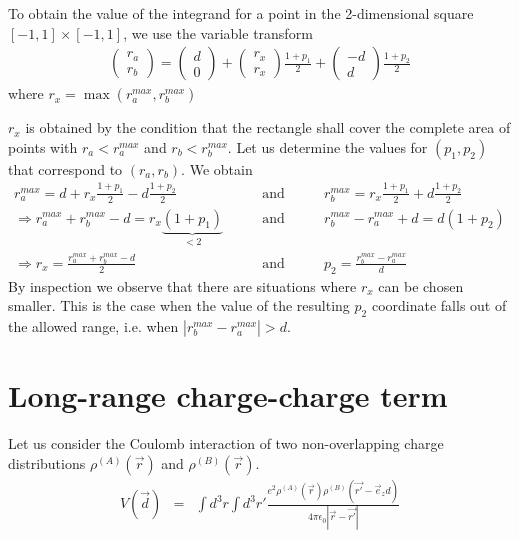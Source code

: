 \documentclass[11pt,a4paper]{report}
\begin{document}
To obtain the value of the integrand for a point in the 2-dimensional
square $[-1,1]\times[-1,1]$, we use the variable transform
\begin{eqnarray*}
\left(\begin{array}{c}r_a\\r_b\end{array}\right)
=\left(\begin{array}{c}d\\0\end{array}\right)
+\left(\begin{array}{c}r_x\\r_x\end{array}\right)\frac{1+p_1}{2}
+\left(\begin{array}{c}-d\\d\end{array}\right)\frac{1+p_2}{2}
\end{eqnarray*}
where $r_x=\max(r_a^{max},r_b^{max})$

$r_x$ is obtained by the condition that the rectangle shall cover the
complete area of points with $r_a<r_a^{max}$ and $r_b< r_b^{max}$.
Let us determine the values for $(p_1,p_2)$ that correspond to $(r_a,r_b)$.
We obtain
\begin{eqnarray*}
r^{max}_a=d+r_x\frac{1+p_1}{2}-d\frac{1+p_2}{2}
&\qquad\text{and}\qquad&
r^{max}_b=r_x\frac{1+p_1}{2}+d\frac{1+p_2}{2}
\\
\Rightarrow
r^{max}_a+r^{max}_b-d=r_x\underbrace{(1+p_1)}_{<2}
&\qquad\text{and}\qquad&
r^{max}_b-r^{max}_a+d=d(1+p_2)
\\
\Rightarrow
r_x=\frac{r^{max}_a+r^{max}_b-d}{2}
&\qquad\text{and}\qquad&
p_2=\frac{r^{max}_b-r^{max}_a}{d}
\end{eqnarray*}
By inspection we observe that there are situations where $r_x$ can be
chosen smaller. This is the case when the value of the resulting $p_2$
coordinate falls out of the allowed range, i.e. when
$|r^{max}_b-r^{max}_a|>d$.




\section{Long-range charge-charge term}
Let us consider the Coulomb interaction of two non-overlapping charge
distributions $\rho^{(A)}(\vec{r})$ and $\rho^{(B)}(\vec{r})$.
\begin{eqnarray*}
V(\vec{d})&=& \int d^3r\int d^3r'\frac{e^2\rho^{(A)}(\vec{r})\rho^{(B)}(\vec{r'}-\vec{e}_z d)}
{4\pi\epsilon_{0}|\vec{r}-\vec{r'}|}
\end{eqnarray*}
\end{document}
